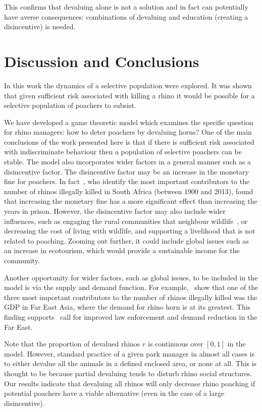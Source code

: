 \documentclass[10pt]{article}
\begin{document}
This confirms that devaluing alone is not a solution and in fact can
potentially have averse consequences: combinations of devaluing and
education (creating a disincentive) is needed.

\section{Discussion and Conclusions}
\label{section:discussion}

In this work the dynamics of a selective population were explored. It was shown
that given sufficient risk associated with killing a rhino it would be possible
for a selective population of poachers to subsist.

We have developed a game theoretic model which examines the specific question
for rhino managers: how to deter poachers by devaluing horns?  One of the main
conclusions of the work presented here is that if there is sufficient risk
associated with indiscriminate behaviour then a population of selective poachers
can be stable. The model also incorporates wider factors in a general manner such as
a disincentive factor. The disincentive factor may be an increase in the
monetary fine for poachers. In fact~\cite{di2015identification}, who identify
the most important contributors to the number of rhinos illegally killed in
South Africa (between 1900 and 2013), found that increasing the monetary fine
has a more significant effect than increasing the years in prison. However, the
disincentive factor may also include wider influences, such as engaging the
rural communities that neighbour wildlife~\cite{Duan2013}, or decreasing the
cost of living with wildlife, and supporting a livelihood that is not related to
poaching. Zooming out further, it could include global issues such as an
increase in ecotourism, which would provide a sustainable income for the
community.

Another opportunity for wider factors, such as global issues, to be included in
the model is via the supply and demand function. For example,~\cite{di2015identification}
show that one of the three most important contributors to the number of rhinos illegally
killed was the GDP in Far East Asia, where the demand for rhino horn is at its greatest.
This finding supports~\cite{lawson2014global} call for improved law enforcement and
demand reduction in the Far East.

Note that the proportion of devalued rhinos \(r\) is continuous over \([0, 1]\)
in the model. However, standard practice of a given park manager in almost all
cases is to either devalue all the animals in a defined enclosed area, or none
at all. This is thought to be because partial devaluing tends to disturb
rhino social structures. Our results indicate that devaluing all rhinos will
only decrease rhino poaching if potential poachers have a viable alternative
(even in the case of a large disincentive).
\end{document}
